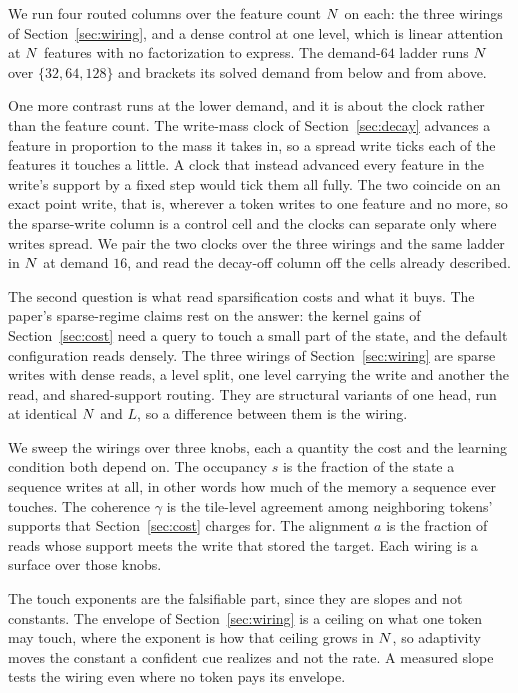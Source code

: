 We run four routed columns over the feature count $N$ on each: the three wirings of Section~\ref{sec:wiring}, and a dense control at one level, which is linear attention at $N$ features with no factorization to express. The demand-$64$ ladder runs $N$ over $\{32, 64, 128\}$ and brackets its solved demand from below and from above.

One more contrast runs at the lower demand, and it is about the clock rather than the feature count. The write-mass clock of Section~\ref{sec:decay} advances a feature in proportion to the mass it takes in, so a spread write ticks each of the features it touches a little. A clock that instead advanced every feature in the write's support by a fixed step would tick them all fully. The two coincide on an exact point write, that is, wherever a token writes to one feature and no more, so the sparse-write column is a control cell and the clocks can separate only where writes spread. We pair the two clocks over the three wirings and the same ladder in $N$ at demand $16$, and read the decay-off column off the cells already described.

The second question is what read sparsification costs and what it buys. The paper's sparse-regime claims rest on the answer: the kernel gains of Section~\ref{sec:cost} need a query to touch a small part of the state, and the default configuration reads densely. The three wirings of Section~\ref{sec:wiring} are sparse writes with dense reads, a level split, one level carrying the write and another the read, and shared-support routing. They are structural variants of one head, run at identical $N$ and $L$, so a difference between them is the wiring.

We sweep the wirings over three knobs, each a quantity the cost and the learning condition both depend on. The occupancy $s$ is the fraction of the state a sequence writes at all, in other words how much of the memory a sequence ever touches. The coherence $\gamma$ is the tile-level agreement among neighboring tokens' supports that Section~\ref{sec:cost} charges for. The alignment $a$ is the fraction of reads whose support meets the write that stored the target. Each wiring is a surface over those knobs.

The touch exponents are the falsifiable part, since they are slopes and not constants. The envelope of Section~\ref{sec:wiring} is a ceiling on what one token may touch, where the exponent is how that ceiling grows in $N$, so adaptivity moves the constant a confident cue realizes and not the rate. A measured slope tests the wiring even where no token pays its envelope.

